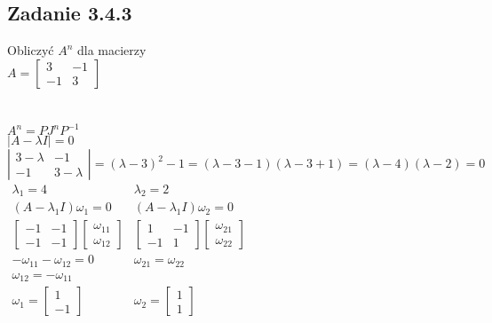 \pagebreak
\subsection*{Zadanie 3.4.3} {\color{darkgray}
	Obliczyć $A^n$ dla macierzy\\
	$A=\left[ \begin{array}{cc} 3&-1\\-1&3\end{array}\right]$\\
}\lineh
\\\\
$A^n=PJ^nP^{-1}$\\
$|A- \lambda I|=0$\\
$\left|\begin{array}{cc} 3-\lambda&-1\\-1&3-\lambda\end{array}\right|=(\lambda-3)^2-1=(\lambda-3-1)(\lambda-3+1)=(\lambda-4)(\lambda-2)=0$\\
$\begin{array}{cc}
\lambda_1=4 &\lambda_2=2\\
	(A-\lambda_1I)\omega_1=0		& (A-\lambda_1I)\omega_2=0 \\
	     \left[ \begin{array}{cc} -1&-1\\-1&-1\end{array}\right]  \left[ \begin{array}{c}\omega_{11}\\\omega_{12}\end{array}\right]
	&   \left[ \begin{array}{cc} 1&-1\\-1&1\end{array}\right]    \left[ \begin{array}{c}\omega_{21}\\\omega_{22}\end{array}\right]
	\\ -\omega_{11}-\omega_{12}=0	&\omega_{21}=\omega_{22}\\
	\omega_{12}=-\omega_{11}& \\
	\omega_1=\left[ \begin{array}{c}1\\-1\end{array}\right] 	&\omega_2=\left[ \begin{array}{c}1\\1\end{array}\right]
\end{array}$\\
